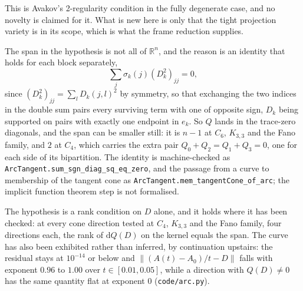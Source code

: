 \documentclass[11pt]{article}
\theoremstyle{remark}
\begin{document}
This is Avakov's 2-regularity condition \cite{Avakov,Arutyunov} in the fully degenerate case, and
no novelty is claimed for it. What is new here is only that the tight projection variety is in its
scope, which is what the frame reduction supplies.

The span in the hypothesis is not all of $\mathbb R^n$, and the reason is an identity that holds for
each block separately,
\[
\sum_j\sigma_k(j)(D_k^2)_{jj}=0 ,
\]
since $(D_k^2)_{jj}=\sum_lD_k(j,l)^2$ by symmetry, so that exchanging the two indices in the double
sum pairs every surviving term with one of opposite sign, $D_k$ being supported on pairs with
exactly one endpoint in $e_k$. So $Q$ lands in the trace-zero diagonals, and the span can be smaller
still: it is $n-1$ at $C_6$, $K_{3,3}$ and the Fano family, and $2$ at $C_4$, which carries the extra
pair $Q_0+Q_2=Q_1+Q_3=0$, one for each side of its bipartition. The identity is machine-checked as
\texttt{ArcTangent.sum\_sgn\_diag\_sq\_eq\_zero}, and the passage from a curve to membership of the
tangent cone as \texttt{ArcTangent.mem\_tangentCone\_of\_arc}; the implicit function theorem step is
not formalised.

The hypothesis is a rank condition on $D$ alone, and it holds where it has been checked: at every
cone direction tested at $C_4$, $K_{3,3}$ and the Fano family, four directions each, the rank of
$\mathrm dQ(D)$ on the kernel equals the span. The curve has also been exhibited rather than
inferred, by continuation upstairs: the residual stays at $10^{-14}$ or below and
$\|(A(t)-A_0)/t-D\|$ falls with exponent $0.96$ to $1.00$ over $t\in[0.01,0.05]$, while a direction
with $Q(D)\neq0$ has the same quantity flat at exponent $0$ (\texttt{code/arc.py}).
\end{document}
